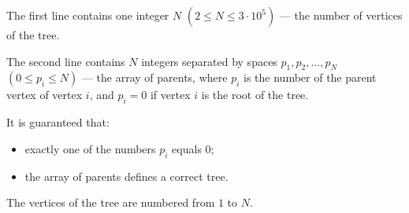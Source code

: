 The first line contains one integer $N$ $(2 \le N \le 3 \cdot 10^5)$ --- the number of vertices of the tree.

The second line contains $N$ integers separated by spaces $p_1, p_2, \ldots, p_N$ $(0 \le p_i \le N)$ --- the array of parents, where $p_i$ is the number of the parent vertex of vertex $i$, and $p_i = 0$ if vertex $i$ is the root of the tree.

It is guaranteed that:

\begin{itemize}

\item exactly one of the numbers $p_i$ equals $0$;

\item the array of parents defines a correct tree.

\end{itemize}

The vertices of the tree are numbered from $1$ to $N$.

